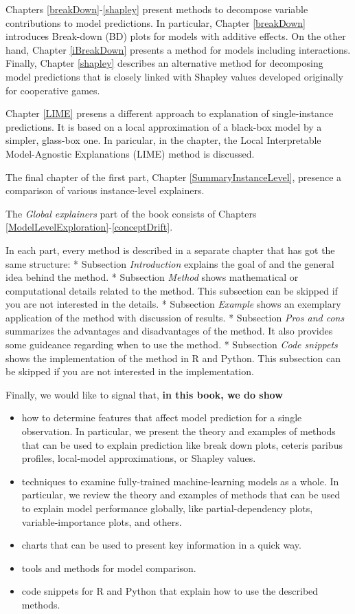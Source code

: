 \documentclass[12pt,]{krantz}
\providecommand{\tightlist}{%
  \setlength{\itemsep}{0pt}\setlength{\parskip}{0pt}}
\theoremstyle{definition}
\theoremstyle{definition}
\theoremstyle{definition}
\theoremstyle{remark}
\begin{document}
Chapters \ref{breakDown}-\ref{shapley} present methods to decompose
variable contributions to model predictions. In particular, Chapter
\ref{breakDown} introduces Break-down (BD) plots for models with
additive effects. On the other hand, Chapter \ref{iBreakDown} presents a
method for models including interactions. Finally, Chapter \ref{shapley}
describes an alternative method for decomposing model predictions that
is closely linked with Shapley values \citep{shapleybook1952} developed
originally for cooperative games.

Chapter \ref{LIME} presens a different approach to explanation of
single-instance predictions. It is based on a local approximation of a
black-box model by a simpler, glass-box one. In paricular, in the
chapter, the Local Interpretable Model-Agnostic Explanations (LIME)
method \citep{lime} is discussed.

The final chapter of the first part, Chapter \ref{SummaryInstanceLevel},
presence a comparison of various instance-level explainers.

The \emph{Global explainers} part of the book consists of Chapters
\ref{ModelLevelExploration}-\ref{conceptDrift}.

In each part, every method is described in a separate chapter that has
got the same structure: * Subsection \emph{Introduction} explains the
goal of and the general idea behind the method. * Subsection
\emph{Method} shows mathematical or computational details related to the
method. This subsection can be skipped if you are not interested in the
details. * Subsection \emph{Example} shows an exemplary application of
the method with discussion of results. * Subsection \emph{Pros and cons}
summarizes the advantages and disadvantages of the method. It also
provides some guideance regarding when to use the method. * Subsection
\emph{Code snippets} shows the implementation of the method in R and
Python. This subsection can be skipped if you are not interested in the
implementation.

Finally, we would like to signal that, \textbf{in this book, we do show}

\begin{itemize}
\tightlist
\item
  how to determine features that affect model prediction for a single
  observation. In particular, we present the theory and examples of
  methods that can be used to explain prediction like break down plots,
  ceteris paribus profiles, local-model approximations, or Shapley
  values.
\item
  techniques to examine fully-trained machine-learning models as a
  whole. In particular, we review the theory and examples of methods
  that can be used to explain model performance globally, like
  partial-dependency plots, variable-importance plots, and others.
\item
  charts that can be used to present key information in a quick way.
\item
  tools and methods for model comparison.
\item
  code snippets for R and Python that explain how to use the described
  methods.
\end{itemize}
\end{document}
